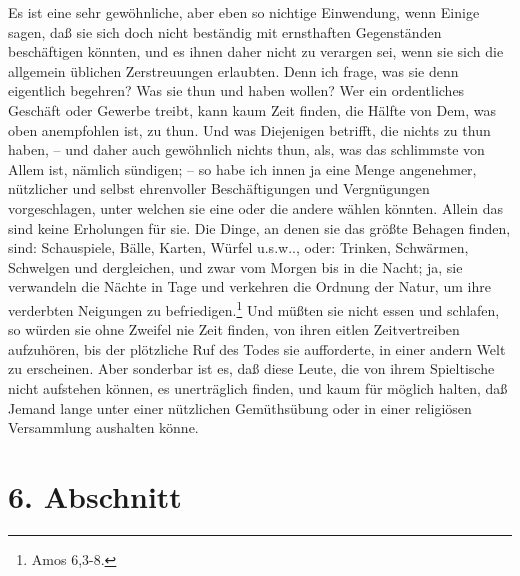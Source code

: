 Es ist eine sehr gewöhnliche, aber eben so nichtige Einwendung, wenn Einige sagen, daß sie sich doch nicht beständig mit ernsthaften Gegenständen beschäftigen könnten, und es ihnen daher nicht zu verargen sei, wenn sie sich die allgemein üblichen Zerstreuungen erlaubten. Denn ich frage, was sie denn eigentlich begehren? Was sie thun und haben wollen? Wer ein ordentliches Geschäft oder Gewerbe treibt, kann kaum Zeit finden, die Hälfte von Dem, was oben anempfohlen ist, zu thun. Und was Diejenigen betrifft, die nichts zu thun haben, -- und daher auch gewöhnlich nichts thun, als, was das schlimmste von Allem ist, nämlich sündigen; -- so habe ich innen ja eine Menge angenehmer, nützlicher und selbst ehrenvoller Beschäftigungen und Vergnügungen vorgeschlagen, unter welchen sie eine oder die andere wählen könnten. Allein das sind keine Erholungen für sie. Die Dinge, an denen sie das größte Behagen finden, sind: Schauspiele, Bälle, Karten, Würfel u.s.w.., oder: Trinken, Schwärmen, Schwelgen und dergleichen, und zwar vom Morgen bis in die Nacht; ja, sie verwandeln die Nächte in Tage und verkehren die Ordnung der Natur, um ihre verderbten Neigungen zu befriedigen.\footnote{Amos 6,3-8.} Und müßten sie nicht essen und schlafen, so würden sie ohne Zweifel nie Zeit finden, von ihren eitlen Zeitvertreiben aufzuhören, bis der plötzliche Ruf des Todes sie aufforderte, in einer andern Welt zu erscheinen. Aber sonderbar ist es, daß diese Leute, die von ihrem Spieltische nicht aufstehen können, es unerträglich finden, und kaum für möglich halten, daß Jemand lange unter einer nützlichen Gemüthsübung oder in einer religiösen Versammlung aushalten könne.

\section{6. Abschnitt}

